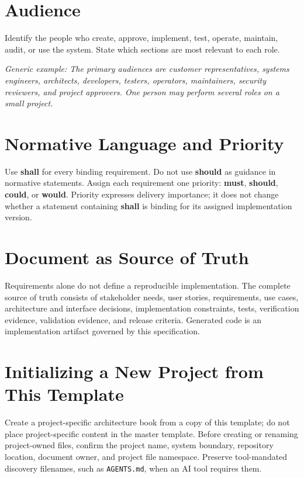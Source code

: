 \section{Audience}
Identify the people who create, approve, implement, test, operate, maintain,
audit, or use the system. State which sections are most relevant to each role.

\textit{Generic example: The primary audiences are customer representatives,
systems engineers, architects, developers, testers, operators, maintainers,
security reviewers, and project approvers. One person may perform several
roles on a small project.}

\section{Normative Language and Priority}
Use \textbf{shall} for every binding requirement. Do not use \textbf{should} as
guidance in normative statements. Assign each requirement one priority:
\textbf{\gls{must}}, \textbf{\gls{should}}, \textbf{\gls{could}}, or
\textbf{\gls{would}}. Priority expresses delivery importance; it does not change
whether a statement containing \textbf{shall} is binding for its assigned
implementation version.

\section{Document as Source of Truth}
Requirements alone do not define a reproducible implementation. The complete
source of truth consists of stakeholder needs, user stories, requirements, use
cases, architecture and interface decisions, implementation constraints,
tests, verification evidence, validation evidence, and release criteria.
Generated code is an implementation artifact governed by this specification.

\section{Initializing a New Project from This Template}
\label{Section:InitializeNewProject}
Create a project-specific architecture book from a copy of this template; do
not place project-specific content in the master template. Before creating or
renaming project-owned files, confirm the project name, system boundary,
repository location, document owner, and project file namespace. Preserve
tool-mandated discovery filenames, such as \texttt{AGENTS.md}, when an AI tool
requires them.

